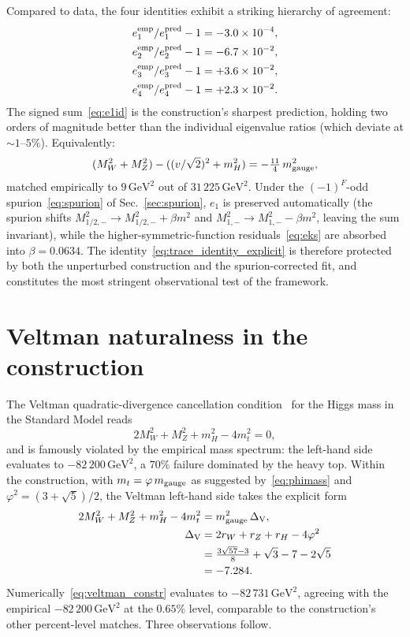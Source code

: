 \documentclass[twocolumn,aps,prd,floatfix,nofootinbib,superscriptaddress,10pt]{article}
\newcommand{\MW}{M_W}
\newcommand{\MZ}{M_Z}
\newcommand{\mH}{m_H}
\newcommand{\GeV}{\,\mathrm{GeV}}
\begin{document}
Compared to data, the four identities exhibit a striking hierarchy of agreement:
\begin{equation}
\begin{aligned}
e_1^{\rm emp}/e_1^{\rm pred} - 1 &= -3.0\times 10^{-4}, \\
e_2^{\rm emp}/e_2^{\rm pred} - 1 &= -6.7\times 10^{-2}, \\
e_3^{\rm emp}/e_3^{\rm pred} - 1 &= +3.6\times 10^{-2}, \\
e_4^{\rm emp}/e_4^{\rm pred} - 1 &= +2.3\times 10^{-2}.
\end{aligned}
\label{eq:eks}
\end{equation}
The signed sum~\eqref{eq:e1id} is the construction's sharpest prediction, holding two orders of magnitude better than the individual eigenvalue ratios (which deviate at $\sim 1$--$5\%$). Equivalently:
\begin{equation}
(M_W^2+M_Z^2)-((v/\sqrt2)^2+m_H^2) = -\tfrac{11}{4}\,m_{\rm gauge}^2,
\label{eq:trace_identity_explicit}
\end{equation}
matched empirically to $9\GeV^2$ out of $31\,225\GeV^2$. Under the $(-1)^F$-odd spurion~\eqref{eq:spurion} of Sec.~\ref{sec:spurion}, $e_1$ is preserved automatically (the spurion shifts $M^2_{1/2,-}\to M^2_{1/2,-}+\beta m^2$ and $M^2_{1,-}\to M^2_{1,-}-\beta m^2$, leaving the sum invariant), while the higher-symmetric-function residuals~\eqref{eq:eks} are absorbed into $\beta=0.0634$. The identity~\eqref{eq:trace_identity_explicit} is therefore protected by both the unperturbed construction and the spurion-corrected fit, and constitutes the most stringent observational test of the framework.

\section{Veltman naturalness in the construction}
\label{app:veltman}

The Veltman quadratic-divergence cancellation condition~\cite{Veltman1981} for the Higgs mass in the Standard Model reads
\begin{equation}
2\MW^2 + \MZ^2 + \mH^2 - 4 m_t^2 = 0,
\label{eq:veltman_identity}
\end{equation}
and is famously violated by the empirical mass spectrum: the left-hand side evaluates to $-82\,200\GeV^2$, a $70\%$ failure dominated by the heavy top. Within the construction, with $m_t=\varphi\,m_{\rm gauge}$ as suggested by~\eqref{eq:phimass} and $\varphi^2=(3+\sqrt5)/2$, the Veltman left-hand side takes the explicit form
\begin{align}
\notag
2\MW^2 + \MZ^2 + \mH^2 - 4 m_t^2 &= m_{\rm gauge}^2\,\Delta_{\rm V},\\
\Delta_{\rm V} &= 2r_W+r_Z+r_H-4\varphi^2 \notag\\
&= \tfrac{3\sqrt{57}-3}{8}+\sqrt3-7-2\sqrt5 \notag\\
&= -7.284.
\label{eq:veltman_constr}
\end{align}
Numerically~\eqref{eq:veltman_constr} evaluates to $-82\,731\GeV^2$, agreeing with the empirical $-82\,200\GeV^2$ at the $0.65\%$ level, comparable to the construction's other percent-level matches. Three observations follow.
\end{document}
